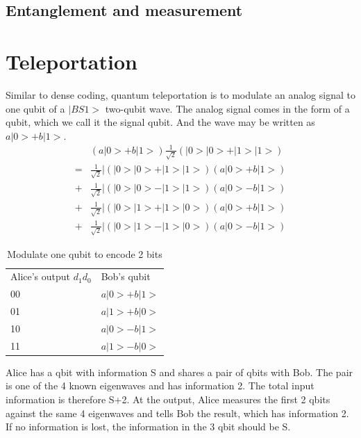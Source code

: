 \documentclass{book}
\begin{document}
\subsection{Entanglement and measurement}

\section{Teleportation}
Similar to dense coding, quantum teleportation is to modulate an analog signal to one qubit of a $|BS1>$ two-qubit wave. The analog signal comes in the form of a qubit, which we call it the signal qubit. And the wave may be written as $a |0> + b|1>$.
\begin{equation}\label{}
\begin{array}{rl}
    & (a |0> + b|1>) \frac 1 {\sqrt 2}(|0>|0>+|1>|1>) \\
    = & \frac 1 {\sqrt 2}| (|0>|0>+|1>|1>) (a |0> + b|1>) \\
    +& \frac 1 {\sqrt 2}| (|0>|0>-|1>|1>) (a |0> - b|1>) \\
    +& \frac 1 {\sqrt 2}| (|0>|1>+|1>|0>) (a |0> + b|1>) \\
    +& \frac 1 {\sqrt 2}| (|0>|1>-|1>|0>) (a |0> - b|1>)
\end{array}
\end{equation}

\begin{table}[]
\caption{Modulate one qubit to encode 2 bits}
\label{TeleportationTable}
\begin{tabular}{ll}
Alice's output $d_1 d_0$ & Bob's qubit  \\
00 & $a|0>+b|1>$ \\
01 & $a|1>+b|0>$ \\
10 & $a|0>-b|1>$  \\
11 & $a|1>-b|0>$ 
\end{tabular}
\end{table}

Alice has a qbit with information S and shares a pair of qbits with Bob. The pair is one of the 4 known eigenwaves and has information 2. The total input information is therefore S+2. At the output, Alice measures the first 2 qbits against the same 4 eigenwaves and tells Bob the result, which has information 2. If no information is lost, the information in the 3 qbit should be S.
\end{document}
